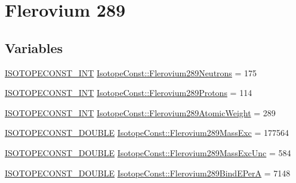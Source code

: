 \hypertarget{group___isotope_const-_flerovium-_fl289}{}\section{Flerovium 289}
\label{group___isotope_const-_flerovium-_fl289}
\subsection*{Variables}
\begin{DoxyCompactItemize}
\item 
\mbox{\hyperlink{group___isotope_const-_macros_ga5f18360b3e99483a35c32d789e62621c}{I\+S\+O\+T\+O\+P\+E\+C\+O\+N\+S\+T\+\_\+\+I\+NT}} \mbox{\hyperlink{group___isotope_const-_flerovium-_fl289_ga72c7e6de646a1064b4863e103f116097}{Isotope\+Const\+::\+Flerovium289\+Neutrons}} = 175
\item 
\mbox{\hyperlink{group___isotope_const-_macros_ga5f18360b3e99483a35c32d789e62621c}{I\+S\+O\+T\+O\+P\+E\+C\+O\+N\+S\+T\+\_\+\+I\+NT}} \mbox{\hyperlink{group___isotope_const-_flerovium-_fl289_ga6a59b7ae078c34845968a4b09039408a}{Isotope\+Const\+::\+Flerovium289\+Protons}} = 114
\item 
\mbox{\hyperlink{group___isotope_const-_macros_ga5f18360b3e99483a35c32d789e62621c}{I\+S\+O\+T\+O\+P\+E\+C\+O\+N\+S\+T\+\_\+\+I\+NT}} \mbox{\hyperlink{group___isotope_const-_flerovium-_fl289_ga255f06df97078b73a0216a0da310fd1e}{Isotope\+Const\+::\+Flerovium289\+Atomic\+Weight}} = 289
\item 
\mbox{\hyperlink{group___isotope_const-_macros_ga8f45a7272ce02c0b4c65c44636ed719a}{I\+S\+O\+T\+O\+P\+E\+C\+O\+N\+S\+T\+\_\+\+D\+O\+U\+B\+LE}} \mbox{\hyperlink{group___isotope_const-_flerovium-_fl289_ga0a4e698113eea71ad4cc7ccf0b118abf}{Isotope\+Const\+::\+Flerovium289\+Mass\+Exc}} = 177564
\item 
\mbox{\hyperlink{group___isotope_const-_macros_ga8f45a7272ce02c0b4c65c44636ed719a}{I\+S\+O\+T\+O\+P\+E\+C\+O\+N\+S\+T\+\_\+\+D\+O\+U\+B\+LE}} \mbox{\hyperlink{group___isotope_const-_flerovium-_fl289_gaf37a21449f784e448c0c4496f6ab4fea}{Isotope\+Const\+::\+Flerovium289\+Mass\+Exc\+Unc}} = 584
\item 
\mbox{\hyperlink{group___isotope_const-_macros_ga8f45a7272ce02c0b4c65c44636ed719a}{I\+S\+O\+T\+O\+P\+E\+C\+O\+N\+S\+T\+\_\+\+D\+O\+U\+B\+LE}} \mbox{\hyperlink{group___isotope_const-_flerovium-_fl289_ga815944307e36235fe462ea93ba6328ba}{Isotope\+Const\+::\+Flerovium289\+Bind\+E\+PerA}} = 7148
\item 

\end{DoxyCompactItemize}

